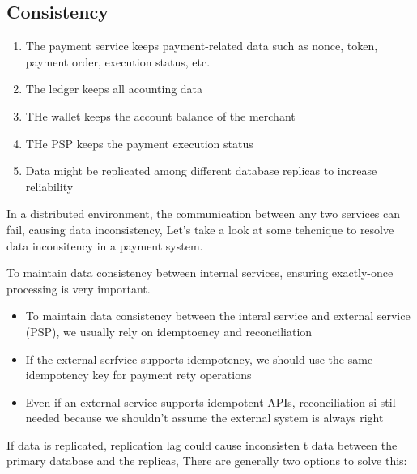 \documentclass{report}
\theoremstyle{definition}
\let\oldsubsection\subsection
\renewcommand{\subsection}{\oldsubsection*}
\begin{document}
\subsection{Consistency}

\begin{enumerate}
\item
The payment service keeps payment-related data such as nonce, token, payment order, execution status, etc.
\item
The ledger keeps all acounting data
\item
THe wallet keeps the account balance of the merchant
\item
THe PSP keeps the payment execution status
\item
Data might be replicated among different database replicas to increase reliability
\end{enumerate}

In a distributed environment, the communication between any two services can fail, causing data inconsistency, Let's take a look at some tehcnique to resolve data inconsitency in a payment system.

To maintain data consistency between internal services, ensuring exactly-once processing is very important.

\begin{itemize}
\item
To maintain data consistency between the interal service and external service (PSP), we usually rely on idemptoency and reconciliation
\item
If the external serfvice supports idempotency, we should use the same idempotency key for payment rety operations
\item
Even if an external service supports idempotent APIs, reconciliation si stil needed because we shouldn't assume the external system is always right
\end{itemize}

If data is replicated, replication lag could cause inconsisten t data between the primary database and the replicas, There are generally two options to solve this:
\end{document}
